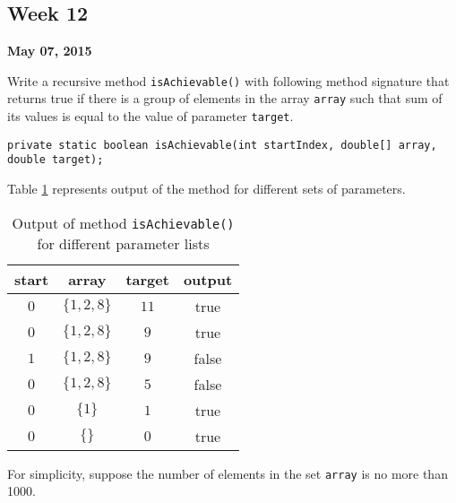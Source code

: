\documentclass[12pt,letterpaper,twoside]{article}
\begin{document}


\subsection*{Week 12}
\hfill \textbf{May 07, 2015}

Write a recursive method \texttt{isAchievable()} with following method signature that returns true if there is a group of elements in the array \texttt{array} such that sum of its values is equal to the value of parameter \texttt{target}.

\lstset{language=java,tabsize=2,numbers=none}
\begin{lstlisting}
private static boolean isAchievable(int startIndex, double[] array, double target);
\end{lstlisting}

Table \ref{tab2} represents output of the method for different sets of parameters.

\begin{table}[H]\centering
\begin{tabular}{cccc}
\hline
start & array & target & output\\
\hline
$0$ & $\{1, 2, 8\}$ & $11$ & true\\
$0$ & $\{1, 2, 8\}$ & $9$  & true\\
$1$ & $\{1, 2, 8\}$ & $9$  & false\\
$0$ & $\{1, 2, 8\}$ & $5$  & false\\
$0$ & $\{1\}$       & $1$  & true\\
$0$ & $\{\} $       & $0$  & true\\
\hline
\end{tabular}
\caption{Output of method \texttt{isAchievable()} for different parameter lists}\label{tab2}
\end{table}

For simplicity, suppose the number of elements in the set \texttt{array} is no more than 1000.
\end{document}
